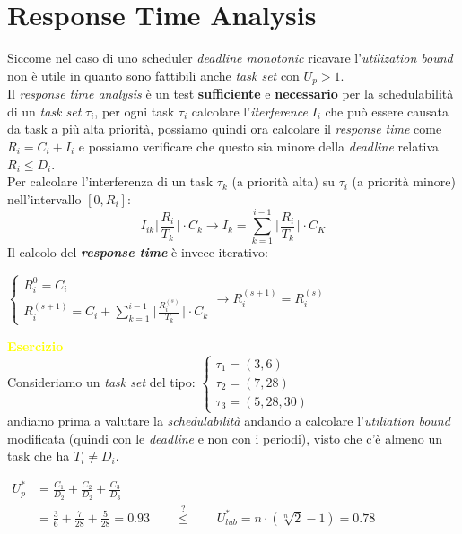 \section{Response Time Analysis}
Siccome nel caso di uno scheduler \textit{deadline monotonic} ricavare l'\textit{utilization bound} non è utile in quanto sono fattibili anche \textit{task set} con $U_p > 1$. \\
Il \textit{response time analysis} è un test \textbf{sufficiente} e \textbf{necessario} per la schedulabilità di un \textit{task set} $\tau_i$, per ogni task $\tau_i$ calcolare l'\textit{iterference} $I_i$ che può essere causata da task a più alta priorità, possiamo quindi ora calcolare il \textit{response time} come $R_i = C_i + I_i$ e possiamo verificare che questo sia minore della \textit{deadline} relativa $R_i \leq D_i$. \\
Per calcolare l'interferenza di un task $\tau_k$ (a priorità alta) su $\tau_i$ (a priorità minore) nell'intervallo $[0, R_i]$: \[ I_{ik} \lceil \frac{R_i}{T_k} \rceil \cdot C_k \rightarrow I_k = \sum_{k=1}^{i-1} \lceil \frac{R_i}{T_k} \rceil \cdot C_K \]
Il calcolo del \textbf{\textit{response time}} è invece iterativo:
\begin{center}
    \begin{math}
        \begin{cases}
            R_i^0 = C_i \\
            R_i^{(s+1)} = C_i + \sum_{k=1}^{i-1} \lceil \frac{R_i^{(s)}}{T_k} \rceil \cdot C_k
        \end{cases}
        \rightarrow R_i^{(s+1)} = R_i^{(s)}
    \end{math}
\end{center}
\newpage
\textcolor{yellow}{\textbf{Esercizio}} \\
Consideriamo un \textit{task set} del tipo:
\begin{math}
    \begin{cases}
        \tau_1 = (3, 6) \\
        \tau_2 = (7, 28) \\
        \tau_3 = (5, 28, 30)
    \end{cases}
\end{math} \\ \newline
andiamo prima a valutare la \textit{schedulabilità} andando a calcolare l'\textit{utiliation bound} modificata (quindi con le \textit{deadline} e non con i periodi), visto che c'è almeno un task che ha $T_i \neq D_i$.
\begin{center}
    \begin{math}
        \begin{aligned}
            U_p^* &= \frac{C_1}{D_2} + \frac{C_2}{D_2} + \frac{C_3}{D_3} \\
            &= \frac{3}{6} + \frac{7}{28} + \frac{5}{28} = 0.93 \qquad \stackrel{\text{?}}{\leq} \qquad U_{lub}^* = n \cdot (\sqrt[n]2 - 1) = 0.78\\
        \end{aligned}
    \end{math}
\end{center}
